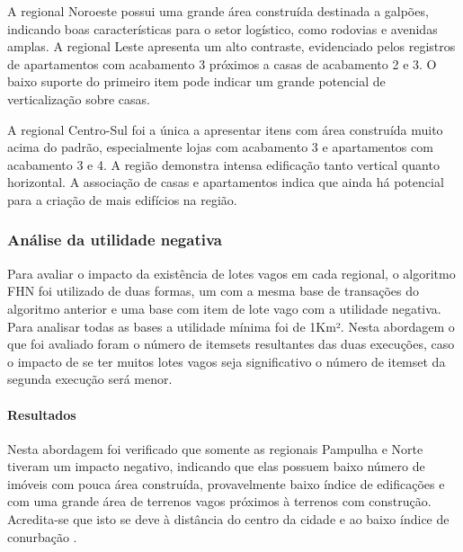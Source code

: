 \documentclass[12pt]{article}
\begin{document}
A regional Noroeste possui uma grande área construída destinada a galpões, indicando boas características para o setor logístico, como rodovias e avenidas amplas. A regional Leste apresenta um alto contraste, evidenciado pelos registros de apartamentos com acabamento 3 próximos a casas de acabamento 2 e 3. O baixo suporte do primeiro item pode indicar um grande potencial de verticalização sobre casas.

A regional Centro-Sul foi a única a apresentar itens com área construída muito acima do padrão, especialmente lojas com acabamento 3 e apartamentos com acabamento 3 e 4. A região demonstra intensa edificação tanto vertical quanto horizontal. A associação de casas e apartamentos indica que ainda há potencial para a criação de mais edifícios na região.

 \subsubsection{Análise da utilidade negativa}
Para avaliar o impacto da existência de lotes vagos em cada regional, o algoritmo FHN \cite{fournier2014fhn} foi utilizado de duas formas, um com a mesma base de transações do algoritmo anterior e uma base com item de lote vago com a utilidade negativa. Para analisar todas as bases a utilidade mínima foi de 1Km².
Nesta abordagem o que foi avaliado foram o número de itemsets resultantes das duas execuções, caso o impacto de se ter muitos lotes vagos seja significativo o número de itemset da segunda execução será menor.

\paragraph{Resultados}
Nesta abordagem foi verificado que somente as regionais Pampulha e Norte tiveram um impacto negativo, indicando que elas possuem baixo número de imóveis com pouca área construída, provavelmente baixo índice de edificações e com uma grande área de terrenos vagos próximos à terrenos com construção. Acredita-se que isto se deve à distância do centro da cidade e ao baixo índice de conurbação \cite{wiki:cornubacao}.
\end{document}
